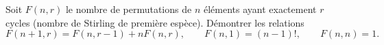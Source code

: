 Soit $F(n, r)$ le nombre de permutations de $n$ éléments ayant exactement $r$ cycles (nombre de Stirling de première espèce). Démontrer les relations
\[ F(n + 1, r) = F(n, r - 1) + nF(n, r),\qquad F(n, 1) = (n - 1)!,\qquad F(n, n) = 1. \]
